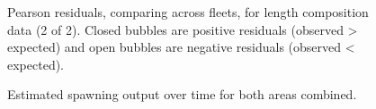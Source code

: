 \documentclass[
]{scrartcl}
\begin{document}
\begin{figure}


\caption{\label{fig-pearsonlenfit2}Pearson residuals, comparing across
fleets, for length composition data (2 of 2). Closed bubbles are
positive residuals (observed \textgreater{} expected) and open bubbles
are negative residuals (observed \textless{} expected).}

\end{figure}%

\begin{figure}


\caption{\label{fig-spout_combined}Estimated spawning output over time
for both areas combined.}

\end{figure}%
\end{document}
